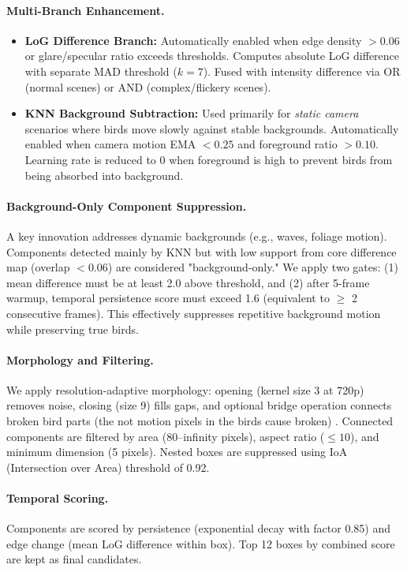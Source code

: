 \paragraph{Multi-Branch Enhancement.}
\begin{itemize}
    \item \textbf{LoG Difference Branch:} Automatically enabled when edge density $> 0.06$ or glare/specular ratio exceeds thresholds. Computes absolute LoG difference with separate MAD threshold ($k=7$). Fused with intensity difference via OR (normal scenes) or AND (complex/flickery scenes).
    \item \textbf{KNN Background Subtraction:} Used primarily for \textit{static camera} scenarios where birds move slowly against stable backgrounds. Automatically enabled when camera motion EMA $< 0.25$ and foreground ratio $> 0.10$. Learning rate is reduced to 0 when foreground is high to prevent birds from being absorbed into background.
\end{itemize}

\paragraph{Background-Only Component Suppression.}
A key innovation addresses dynamic backgrounds (e.g., waves, foliage motion). Components detected mainly by KNN but with low support from core difference map (overlap $< 0.06$) are considered "background-only." We apply two gates: (1) mean difference must be at least 2.0 above threshold, and (2) after 5-frame warmup, temporal persistence score must exceed 1.6 (equivalent to $\geq$ 2 consecutive frames). This effectively suppresses repetitive background motion while preserving true birds.

\paragraph{Morphology and Filtering.}
We apply resolution-adaptive morphology: opening (kernel size 3 at 720p) removes noise, closing (size 9) fills gaps, and optional bridge operation connects broken bird parts (the not motion pixels in the birds cause broken) . Connected components are filtered by area (80–infinity pixels), aspect ratio ($\leq 10$), and minimum dimension (5 pixels). Nested boxes are suppressed using IoA (Intersection over Area) threshold of 0.92.

\paragraph{Temporal Scoring.}
Components are scored by persistence (exponential decay with factor 0.85) and edge change (mean LoG difference within box). Top 12 boxes by combined score are kept as final candidates.


